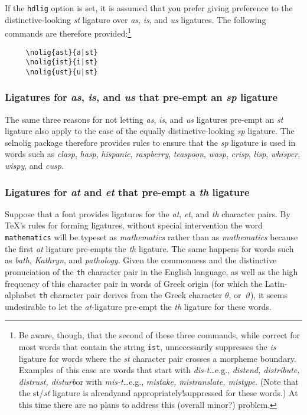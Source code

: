 \documentclass[11pt]{article}
\newcommand{\pkg}[1]{\textsf{#1}}
\newcommand{\opt}[1]{\texttt{#1}}
\begin{document}
If the \opt{hdlig} option is set, it is assumed that you prefer giving preference to the distinctive-looking \emph{st} ligature over \emph{as}, \emph{is}, and \emph{us} ligatures. The following commands are therefore provided:\footnote{Be aware, though, that the second of these three commands, while correct for most words that contain the string \opt{ist}, unnecessarily suppresses the \emph{is} ligature for words where the \emph{st} character pair crosses a morpheme boundary. Examples of this case are words that start with \emph{dis-t\ldots}\textemdash e.g., \emph{distend, distribute, distrust, disturb}\textemdash or with \emph{mis-t\ldots}\textemdash e.g., \emph{mistake, mistranslate, mistype}. (Note that the st/\emph{st} ligature is already\textemdash and appropriately!\textemdash suppressed for these words.) At this time there are no plans to address this (overall minor?) problem.}
\begin{Verbatim}
     \nolig{ast}{a|st}
     \nolig{ist}{i|st}
     \nolig{ust}{u|st}
\end{Verbatim}



\subsubsection*{Ligatures for \emph{as}, \emph{is}, and \emph{us} that pre-empt an \emph{sp} ligature}

The same three reasons for not letting \emph{as}, \emph{is}, and \emph{us} ligatures pre-empt an \emph{st} ligature also apply to the case of the equally distinctive-looking \emph{sp} ligature. The \pkg{selnolig} package therefore provides rules to ensure that the \emph{sp} ligature is used in words such as \emph{clasp}, \emph{hasp}, \emph{hispanic}, \emph{raspberry}, \emph{teaspoon}, \emph{wasp}, \emph{crisp}, \emph{lisp}, \emph{whisper}, \emph{wispy}, and \emph{cusp}. 



\subsubsection*{Ligatures for \emph{at} and \emph{et} that pre-empt a \emph{th} ligature}

Suppose that a font provides ligatures for the \emph{at}, \emph{et}, and \emph{th} character pairs. By \TeX's rules for forming ligatures, without special intervention the word \opt{mathematics} will be typeset as \emph{m\mbox{at}hematics} rather than as \emph{mathematics} because the first \emph{at} ligature pre-empts the \emph{th} ligature. The same happens for words such as \emph{b\mbox{at}h}, \emph{K\mbox{at}hryn}, and \emph{p\mbox{at}hology}.
Given the commonness and the distinctive pronuciation of the \opt{th} character pair in the English language, as well as the high frequency of this character pair in words of Greek origin (for which the Latin-alphabet \opt{th} character pair derives from the Greek character $\theta$, or~$\vartheta$), it seems undesirable to let the \emph{at}-ligature pre-empt the \emph{th} ligature for these words. 
\end{document}
